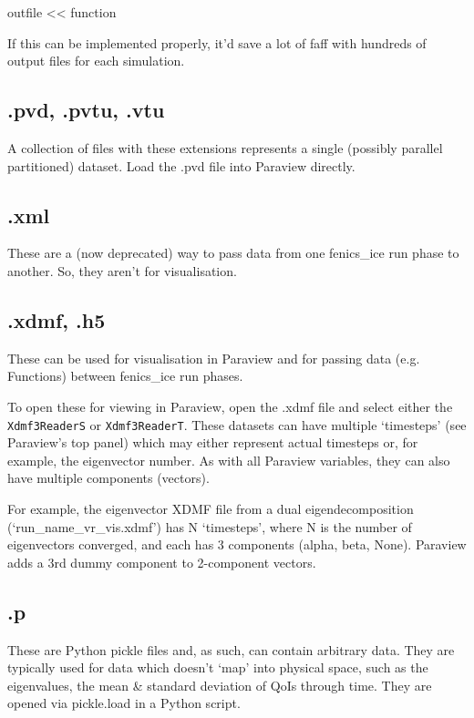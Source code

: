 \documentclass[11pt, reqno, nocenter]{article}
\begin{document}
\begin{spverbatim}
outfile << function
\end{spverbatim}

If this can be implemented properly, it'd save a lot of faff with hundreds of output files for each simulation.

\subsection{.pvd, .pvtu, .vtu}

A collection of files with these extensions represents a single (possibly parallel partitioned) dataset. Load the .pvd file into Paraview directly.

\subsection{.xml}

These are a (now deprecated) way to pass data from one fenics\_ice run phase to another. So, they aren't for visualisation.

\subsection{.xdmf, .h5}

These can be used for visualisation in Paraview and for passing data (e.g. Functions) between fenics\_ice run phases.

To open these for viewing in Paraview, open the .xdmf file and select either the \texttt{Xdmf3ReaderS} or \texttt{Xdmf3ReaderT}. These datasets can have multiple `timesteps' (see Paraview's top panel) which may either represent actual timesteps or, for example, the eigenvector number. As with all Paraview variables, they can also have multiple components (vectors).

For example, the eigenvector XDMF file from a dual eigendecomposition (`run\_name\_vr\_vis.xdmf') has N `timesteps', where N is the number of eigenvectors converged, and each has 3 components (alpha, beta, None). Paraview adds a 3rd dummy component to 2-component vectors.

\subsection{.p}

These are Python pickle files and, as such, can contain arbitrary data. They are typically used for data which doesn't `map' into physical space, such as the eigenvalues, the mean \& standard deviation of QoIs through time. They are opened via pickle.load in a Python script.
\end{document}
